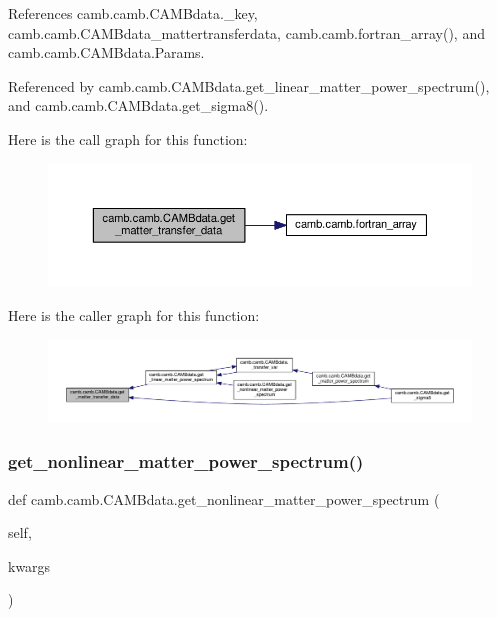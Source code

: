 References camb.\+camb.\+C\+A\+M\+Bdata.\+\_\+key, camb.\+camb.\+C\+A\+M\+Bdata\+\_\+mattertransferdata, camb.\+camb.\+fortran\+\_\+array(), and camb.\+camb.\+C\+A\+M\+Bdata.\+Params.



Referenced by camb.\+camb.\+C\+A\+M\+Bdata.\+get\+\_\+linear\+\_\+matter\+\_\+power\+\_\+spectrum(), and camb.\+camb.\+C\+A\+M\+Bdata.\+get\+\_\+sigma8().

Here is the call graph for this function\+:
\nopagebreak
\begin{figure}[H]
\begin{center}
\leavevmode
\includegraphics[width=350pt]{classcamb_1_1camb_1_1CAMBdata_a81d01bc1ae174319453f1e3565f2dfda_cgraph}
\end{center}
\end{figure}
Here is the caller graph for this function\+:
\nopagebreak
\begin{figure}[H]
\begin{center}
\leavevmode
\includegraphics[width=350pt]{classcamb_1_1camb_1_1CAMBdata_a81d01bc1ae174319453f1e3565f2dfda_icgraph}
\end{center}
\end{figure}
\mbox{\label{classcamb_1_1camb_1_1CAMBdata_a360e97e0d8883903266ec0781188120c}} 
\subsubsection{\texorpdfstring{get\+\_\+nonlinear\+\_\+matter\+\_\+power\+\_\+spectrum()}{get\_nonlinear\_matter\_power\_spectrum()}}
{\footnotesize\ttfamily def camb.\+camb.\+C\+A\+M\+Bdata.\+get\+\_\+nonlinear\+\_\+matter\+\_\+power\+\_\+spectrum (\begin{DoxyParamCaption}\item[{}]{self,  }\item[{}]{kwargs }\end{DoxyParamCaption})}

